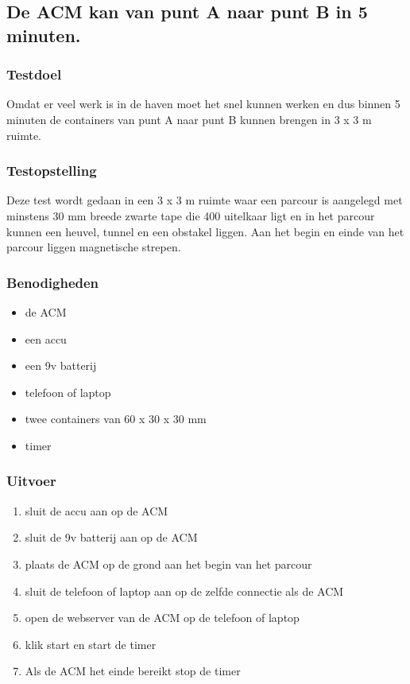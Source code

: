 \subsection{De ACM kan van punt A naar punt B in 5 minuten.}
\subsubsection{Testdoel}
\begin{flushleft}
    Omdat er veel werk is in de haven moet het snel kunnen werken en dus binnen 5 minuten de containers van punt A naar punt B kunnen brengen in 3 x 3 m ruimte.
\end{flushleft}
\subsubsection{Testopstelling}
\begin{flushleft}
    Deze test wordt gedaan in een 3 x 3 m ruimte waar een parcour is aangelegd met minstens 30 mm breede zwarte tape die 400 uitelkaar ligt en in het parcour kunnen een heuvel, tunnel en een obstakel liggen. Aan het begin en einde van het parcour liggen magnetische strepen.
\end{flushleft}
\subsubsection{Benodigheden}

\begin{itemize}
    \item de ACM
    \item een accu
    \item een 9v batterij
    \item telefoon of laptop
    \item twee containers van 60 x 30 x 30 mm
    \item timer
\end{itemize}
\subsubsection{Uitvoer}
\begin{enumerate}
    \item sluit de accu aan op de ACM
    \item sluit de 9v batterij aan op de ACM
    \item plaats de ACM op de grond aan het begin van het parcour
    \item sluit de telefoon of laptop aan op de zelfde connectie als de ACM
    \item open de webserver van de ACM op de telefoon of laptop
    \item klik start en start de timer
    \item Als de ACM het einde bereikt stop de timer
\end{enumerate}
